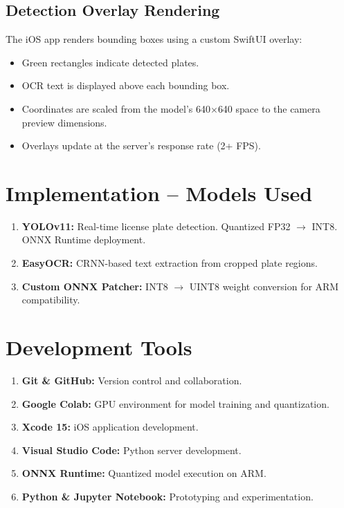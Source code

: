 \documentclass[11pt]{report}
\begin{document}
\subsection{Detection Overlay Rendering}
The iOS app renders bounding boxes using a custom SwiftUI overlay:
\begin{itemize}
    \item Green rectangles indicate detected plates.
    \item OCR text is displayed above each bounding box.
    \item Coordinates are scaled from the model's 640$\times$640 space to the camera preview dimensions.
    \item Overlays update at the server's response rate (2+ FPS).
\end{itemize}

\section{Implementation -- Models Used}
\begin{enumerate}
    \item \textbf{YOLOv11:} Real-time license plate detection. Quantized FP32 $\to$ INT8. ONNX Runtime deployment.
    \item \textbf{EasyOCR:} CRNN-based text extraction from cropped plate regions.
    \item \textbf{Custom ONNX Patcher:} INT8 $\to$ UINT8 weight conversion for ARM compatibility.
\end{enumerate}

\section{Development Tools}
\begin{enumerate}
    \item \textbf{Git \& GitHub:} Version control and collaboration.
    \item \textbf{Google Colab:} GPU environment for model training and quantization.
    \item \textbf{Xcode 15:} iOS application development.
    \item \textbf{Visual Studio Code:} Python server development.
    \item \textbf{ONNX Runtime:} Quantized model execution on ARM.
    \item \textbf{Python \& Jupyter Notebook:} Prototyping and experimentation.
\end{enumerate}
\end{document}
